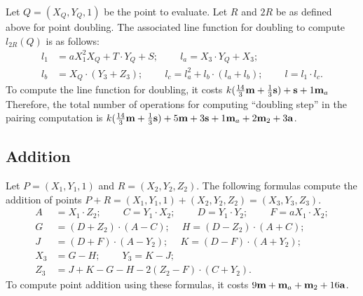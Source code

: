 Let $Q = (X_Q, Y_Q, 1)$ be the point to evaluate.
Let $R$ and $2R$ be as defined above for point doubling.
The associated line function for doubling
to compute $l_{2R}(Q)$ is as follows:
\begin{align*}
l_1 &= a X_1^2 X_Q + T \cdot Y_Q + S;\	\qquad
l_a = X_3 \cdot Y_Q + X_3;	\\
l_b &= X_Q \cdot (Y_3 + Z_3);\			\qquad
l_c = l_a^2 + l_b \cdot (l_a + l_b);\		\qquad
l = l_1 \cdot l_c.
\end{align*}
To compute the line function for doubling,
it costs 
$k(\frac{14}{3}\textbf{m} + \frac{1}{3}\textbf{s}) + \textbf{s} + 1\textbf{m}_{a}$
Therefore, the total number of operations for computing ``doubling step'' in the pairing computation is
$k(\frac{14}{3}\textbf{m} + \frac{1}{3}\textbf{s}) + 5\textbf{m} +3\textbf{s} + 1\textbf{m}_{a} + 2\textbf{m}_{2} + 3\textbf{a}$.



\subsection{Addition}
Let $P = (X_1,Y_1,1)$ and $R = (X_2,Y_2,Z_2)$.
The following formulas compute the addition of points
$P + R = (X_1,Y_1,1) + (X_2,Y_2,Z_2) = (X_3,Y_3,Z_3)$.
\begin{align*}
A &= X_1 \cdot Z_2;\	\qquad
C = Y_1 \cdot X_2;\	\qquad
D = Y_1 \cdot Y_2;\	\qquad
F = a X_1 \cdot X_2;\\
G &= (D + Z_2) \cdot (A - C);\	\quad
H = (D - Z_2) \cdot (A + C);\\
J &= (D + F) \cdot (A - Y_2);\	\quad
K = (D - F) \cdot (A + Y_2);\\
X_3 &= G - H;\	\qquad
Y_3 = K - J;\\
Z_3 &= J + K - G - H - 2(Z_2 - F) \cdot (C + Y_2).
\end{align*}
To compute point addition using these formulas,
it costs $9\textbf{m} + \textbf{m}_{a} + \textbf{m}_{2} + 16\textbf{a}$.

